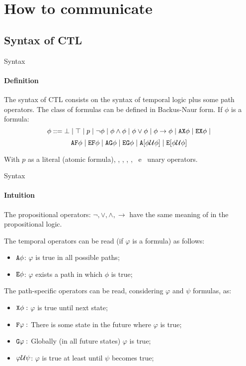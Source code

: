 \section{How to communicate}
\subsection{Syntax of CTL}
\begin{frame}{Syntax}
	\framesubtitle{Definition}
	The syntax of CTL consists on the syntax of temporal logic plus some path operators. The class of formulas can be defined in Backus-Naur form. If $\phi$ is a formula: \pause
	$$\phi ::= \bot \; | \; \top \; | \; p \; | \; \neg \phi \; | \; \phi \land \phi \; | \; \phi \lor \phi \; | \; \phi \to \phi \; | \; \texttt{AX} \phi \; | \; \texttt{EX} \phi \; | $$
	$$\texttt{AF} \phi \; | \; \texttt{EF} \phi \; | \; \texttt{AG} \phi \; | \; \texttt{EG} \phi \; | \; \texttt{A}[\phi \mathcal{U} \phi] \; | \; \texttt{E}[\phi \mathcal{U} \phi]$$\pause
	
	With $p$ as a literal (atomic formula), \AX, \EX, \AF, \EF, \AG \, e \EG \, unary operators.
	
\end{frame}

\begin{frame}{Syntax}
	\framesubtitle{Intuition}
	The propositional operators: $\neg, \lor, \land, \to$ have the same meaning of in the propositional logic.\pause
	
	The temporal operators can be read (if $\varphi$ is a formula) as follows: \pause
	\begin{itemize}
		\item 
		{
			$\texttt{A} \phi$: $\varphi$ is true in all possible paths;
			\pause
		}
		\item 
		{
			$\texttt{E} \phi$: $\varphi$ exists a path in which $\phi$ is true;
			\pause
		}
	\end{itemize}
	
	The path-specific operators can be read, considering $\varphi$ and $\psi$ formulas, as: \pause
	\begin{itemize}
		\item 
		{
			$\texttt{X} \phi:$ $\varphi$ is  true until next state;
			\pause
		}
		\item 
		{
			$\texttt{F} \varphi:$ There is some state in the future where $\varphi$ is true;
			\pause
		}
		\item
		{
			$\texttt{G} \varphi: $ Globally (in all future states) $\varphi$ is true;
			\pause
		}
		\item
		{
			$\varphi \mathcal{U} \psi$: $\varphi$ is true at least until $\psi$ becomes true;	
		}
	\end{itemize}
	
\end{frame}

